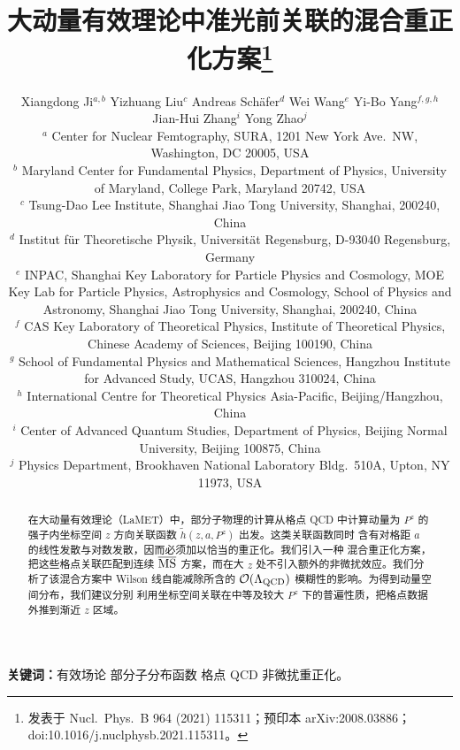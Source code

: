 \documentclass[11pt]{ctexart}
\title{大动量有效理论中准光前关联的混合重正化方案\thanks{发表于
Nucl.\ Phys.\ B 964 (2021) 115311；预印本 arXiv:2008.03886；
doi:10.1016/j.nuclphysb.2021.115311。}}
\author{
Xiangdong Ji$^{a,b}$ \quad
Yizhuang Liu$^{c}$ \quad
Andreas Sch\"{a}fer$^{d}$ \quad
Wei Wang$^{e}$ \quad
Yi-Bo Yang$^{f,g,h}$ \quad
Jian-Hui Zhang$^{i}$ \quad
Yong Zhao$^{j}$
\\[1.2em]
\normalsize
$^a$ Center for Nuclear Femtography, SURA, 1201 New York Ave.\ NW,
Washington, DC 20005, USA\\
$^b$ Maryland Center for Fundamental Physics, Department of Physics,
University of Maryland, College Park, Maryland 20742, USA\\
$^c$ Tsung-Dao Lee Institute, Shanghai Jiao Tong University, Shanghai,
200240, China\\
$^d$ Institut f\"{u}r Theoretische Physik, Universit\"{a}t Regensburg,
D-93040 Regensburg, Germany\\
$^e$ INPAC, Shanghai Key Laboratory for Particle Physics and Cosmology,
MOE Key Lab for Particle Physics, Astrophysics and Cosmology, School of
Physics and Astronomy, Shanghai Jiao Tong University, Shanghai, 200240,
China\\
$^f$ CAS Key Laboratory of Theoretical Physics, Institute of Theoretical
Physics, Chinese Academy of Sciences, Beijing 100190, China\\
$^g$ School of Fundamental Physics and Mathematical Sciences, Hangzhou
Institute for Advanced Study, UCAS, Hangzhou 310024, China\\
$^h$ International Centre for Theoretical Physics Asia-Pacific,
Beijing/Hangzhou, China\\
$^i$ Center of Advanced Quantum Studies, Department of Physics, Beijing
Normal University, Beijing 100875, China\\
$^j$ Physics Department, Brookhaven National Laboratory Bldg.\ 510A,
Upton, NY 11973, USA
}
\date{}
\begin{document}
\maketitle

\begin{abstract}
在大动量有效理论（LaMET）中，部分子物理的计算从格点 QCD 中计算动量为 $P^z$
的强子内坐标空间 $z$ 方向关联函数 $\tilde h(z, a,P^z)$ 出发。这类关联函数同时
含有对格距 $a$ 的线性发散与对数发散，因而必须加以恰当的重正化。我们引入一种
混合重正化方案，把这些格点关联匹配到连续 $\overline{\rm MS}$ 方案，而在大 $z$
处不引入额外的非微扰效应。我们分析了该混合方案中 Wilson 线自能减除所含的
${\cal O}(\Lambda_{\rm QCD})$ 模糊性的影响。为得到动量空间分布，我们建议分别
利用坐标空间关联在中等及较大 $P^z$ 下的普遍性质，把格点数据外推到渐近 $z$ 区域。
\end{abstract}

\noindent\textbf{关键词：}有效场论 \textbullet{} 部分子分布函数
\textbullet{} 格点 QCD \textbullet{} 非微扰重正化。

\bigskip








\end{document}
